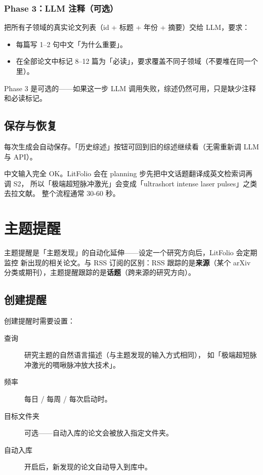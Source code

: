 \subsubsection{Phase 3：LLM 注释（可选）}

把所有子领域的真实论文列表（id + 标题 + 年份 + 摘要）交给 LLM，要求：

\begin{itemize}
  \item 每篇写 1--2 句中文「为什么重要」。
  \item 在全部论文中标记 8--12 篇为「必读」，要求覆盖不同子领域（不要堆在同一个里）。
\end{itemize}

Phase 3 是可选的——如果这一步 LLM 调用失败，综述仍然可用，只是缺少注释和必读标记。

\subsection{保存与恢复}

每次生成会自动保存。「历史综述」按钮可回到旧的综述继续看（无需重新调 LLM 与 API）。

\begin{tipbox}
中文输入完全 OK。LitFolio 会在 planning 步先把中文话题翻译成英文检索词再调 S2，
所以「极端超短脉冲激光」会变成「ultrashort intense laser pulses」之类去拉文献。
整个流程通常 30-60 秒。
\end{tipbox}

\section{主题提醒}

主题提醒是「主题发现」的自动化延伸——设定一个研究方向后，LitFolio 会定期监控
新出现的相关论文。与 RSS 订阅的区别：RSS 跟踪的是\textbf{来源}（某个 arXiv
分类或期刊），主题提醒跟踪的是\textbf{话题}（跨来源的研究方向）。


\subsection{创建提醒}

创建提醒时需要设置：

\begin{description}
  \item[查询] 研究主题的自然语言描述（与主题发现的输入方式相同），
    如「极端超短脉冲激光的啁啾脉冲放大技术」。
  \item[频率] 每日 / 每周 / 每次启动时。
  \item[目标文件夹] 可选——自动入库的论文会被放入指定文件夹。
  \item[自动入库] 开启后，新发现的论文自动导入到库中。
\end{description}

